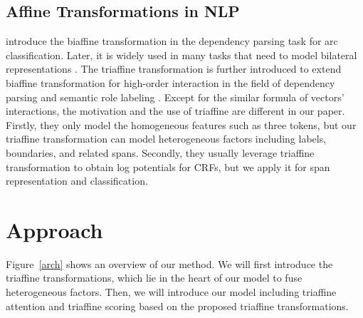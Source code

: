 \documentclass[11pt]{article}
\begin{document}
\subsection{Affine Transformations in NLP}
\citet{dozat2016deep} introduce the biaffine transformation in the dependency parsing task for arc classification. Later, it is widely used in many tasks that need to model bilateral representations \cite{li2019dependency,yu2020named}.
The triaffine transformation is further introduced to extend biaffine transformation for high-order interaction in the field of dependency parsing \cite{wang2019second,zhang2020efficient} and semantic role labeling \cite{li2020high}. Except for the similar formula of vectors' interactions, the motivation and the use of triaffine are different in our paper.
Firstly, they only model the homogeneous features such as three tokens, but our triaffine transformation can model heterogeneous factors including labels, boundaries, and related spans. Secondly, they usually leverage triaffine transformation to obtain log potentials for CRFs, but we apply it for span representation and classification.





\section{Approach}

Figure~\ref{arch} shows an overview of our method. We will first introduce the triaffine transformations, which lie in the heart of our model to fuse heterogeneous factors. Then, we will introduce our model including triaffine attention and triaffine scoring based on the proposed triaffine transformations.
\end{document}
